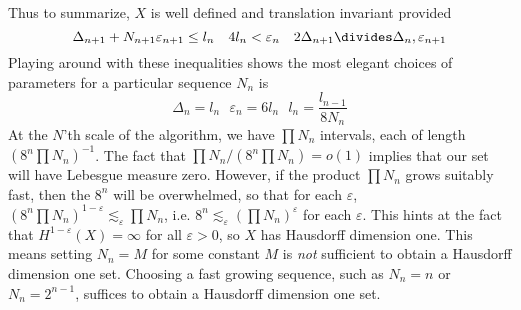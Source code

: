 \documentclass{report}
\theoremstyle{plain}
\theoremstyle{plain}
\begin{document}
Thus to summarize, $X$ is well defined and translation invariant provided
%
\[ \Delta_{n+1} + N_{n+1}\varepsilon_{n+1} \leq l_n\ \ \ 4l_n < \varepsilon_n\ \ \ 2\Delta_{n+1} \divides \Delta_n, \varepsilon_{n+1} \]
%
Playing around with these inequalities shows the most elegant choices of parameters for a particular sequence $N_n$ is
%
\[ \Delta_n = l_n\ \ \ \varepsilon_n = 6l_n\ \ \ l_n = \frac{l_{n-1}}{8N_n} \]
%
At the $N$'th scale of the algorithm, we have $\prod N_n$ intervals, each of length $(8^n \prod N_n)^{-1}$. The fact that $\prod N_n / (8^n \prod N_n) = o(1)$ implies that our set will have Lebesgue measure zero. However, if the product $\prod N_n$ grows suitably fast, then the $8^n$ will be overwhelmed, so that for each $\varepsilon$, $(8^n \prod N_n)^{1-\varepsilon} \lesssim_\varepsilon \prod N_n$, i.e. $8^n \lesssim_\varepsilon (\prod N_n)^\varepsilon$ for each $\varepsilon$. This hints at the fact that $H^{1-\varepsilon}(X) = \infty$ for all $\varepsilon > 0$, so $X$ has Hausdorff dimension one. This means setting $N_n = M$ for some constant $M$ is {\it not} sufficient to obtain a Hausdorff dimension one set. Choosing a fast growing sequence, such as $N_n = n$ or $N_n = 2^{n-1}$, suffices to obtain a Hausdorff dimension one set.
\end{document}
